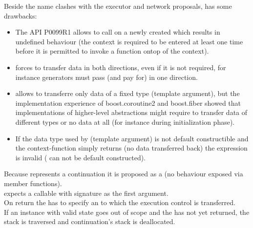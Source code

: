 \label{design}

Beside the name clashes with the executor and network proposals, \ectx has some
drawbacks:
\begin{itemize}
    \item The API P0099R1 allows to call
         on a newly
        created \ectx which results in undefined behaviour (the context is
        required to be entered at least one time before it is permitted to
        invoke a function ontop of the context).
    \item \ectx forces to transfer data in both directions, even if it is not
        required, for instance generators must pass (and pay for)
         in one direction.
    \item \ectx allows to transferre only data of a fixed type (template
        argument), but the implementation experience of boost.coroutine2 and
        boost.fiber showed that implementations of higher-level abstractions
        might require to transfer data of different types or no data at all
        (for instance during initialization phase).
    \item If the data type used by \ectx (template argument) is not default
        constructible and the context-function simply returns (no data
        transferred back) the expression  is
        invalid ( can not be default constructed).\\
\end{itemize}

Because \cont represents a continuation it is proposed as a  (no behaviour exposed via member functions).\\
\call expects a callable with signature
 as the first argument.\\
On return the \entryfn has to specify an \cont to which the execution control is
transferred.\\
If an instance with valid state goes out of scope and the \entryfn has not yet
returned, the stack is traversed  and continuation's stack is deallocated.


\label{subsec:data}

